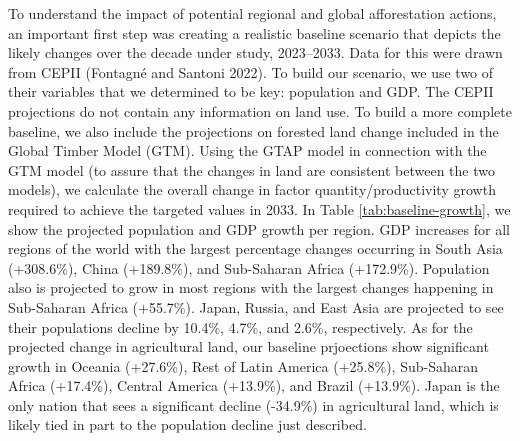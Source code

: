 \documentclass[
]{article}
\begin{document}
To understand the impact of potential regional and global afforestation actions, an important first step was creating a realistic baseline scenario that depicts the likely changes over the decade under study, 2023--2033. Data for this were drawn from CEPII (Fontagné and Santoni 2022). To build our scenario, we use two of their variables that we determined to be key: population and GDP. The CEPII projections do not contain any information on land use. To build a more complete baseline, we also include the projections on forested land change included in the Global Timber Model (GTM). Using the GTAP model in connection with the GTM model (to assure that the changes in land are consistent between the two models), we calculate the overall change in factor quantity/productivity growth required to achieve the targeted values in 2033. In Table \ref{tab:baseline-growth}, we show the projected population and GDP growth per region. GDP increases for all regions of the world with the largest percentage changes occurring in South Asia (+308.6\%), China (+189.8\%), and Sub-Saharan Africa (+172.9\%). Population also is projected to grow in most regions with the largest changes happening in Sub-Saharan Africa (+55.7\%). Japan, Russia, and East Asia are projected to see their populations decline by 10.4\%, 4.7\%, and 2.6\%, respectively. As for the projected change in agricultural land, our baseline prjoections show significant growth in Oceania (+27.6\%), Rest of Latin America (+25.8\%), Sub-Saharan Africa (+17.4\%), Central America (+13.9\%), and Brazil (+13.9\%). Japan is the only nation that sees a significant decline (-34.9\%) in agricultural land, which is likely tied in part to the population decline just described.
\end{document}
